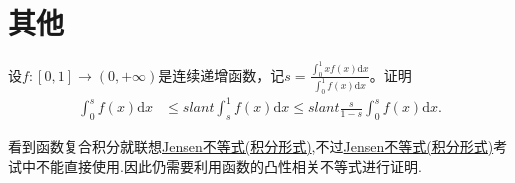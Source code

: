 \documentclass[../../main.tex]{subfiles}
\begin{document}
\section{其他}

\begin{example}
设$f:[0,1]\to(0,+\infty)$是连续递增函数，记$s = \frac{\int_{0}^{1}xf(x)\mathrm{d}x}{\int_{0}^{1}f(x)\mathrm{d}x}$。证明
\begin{align*}
\int_{0}^{s}f(x)\mathrm{d}x&\leqslant slant\int_{s}^{1}f(x)\mathrm{d}x\leqslant slant\frac{s}{1 - s}\int_{0}^{s}f(x)\mathrm{d}x.
\end{align*}
\end{example}
\begin{note}
看到函数复合积分就联想\hyperref[theorem:Jensen不等式积分形式]{Jensen不等式(积分形式)},不过\hyperref[theorem:Jensen不等式积分形式]{Jensen不等式(积分形式)}考试中不能直接使用.因此仍需要利用函数的凸性相关不等式进行证明.
\end{note}
\end{document}
